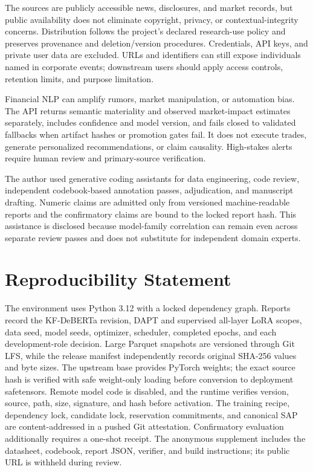 \documentclass[11pt]{article}
\begin{document}
The sources are publicly accessible news, disclosures, and market records, but public availability does not eliminate copyright, privacy, or contextual-integrity concerns. Distribution follows the project's declared research-use policy and preserves provenance and deletion/version procedures. Credentials, API keys, and private user data are excluded. URLs and identifiers can still expose individuals named in corporate events; downstream users should apply access controls, retention limits, and purpose limitation.

Financial NLP can amplify rumors, market manipulation, or automation bias. The API returns semantic materiality and observed market-impact estimates separately, includes confidence and model version, and fails closed to validated fallbacks when artifact hashes or promotion gates fail. It does not execute trades, generate personalized recommendations, or claim causality. High-stakes alerts require human review and primary-source verification.

The author used generative coding assistants for data engineering, code review, independent codebook-based annotation passes, adjudication, and manuscript drafting. Numeric claims are admitted only from versioned machine-readable reports and the confirmatory claims are bound to the locked report hash. This assistance is disclosed because model-family correlation can remain even across separate review passes and does not substitute for independent domain experts.

\section*{Reproducibility Statement}

The environment uses Python 3.12 with a locked dependency graph. Reports record the KF-DeBERTa revision, DAPT and supervised all-layer LoRA scopes, data seed, model seeds, optimizer, scheduler, completed epochs, and each development-role decision. Large Parquet snapshots are versioned through Git LFS, while the release manifest independently records original SHA-256 values and byte sizes. The upstream base provides PyTorch weights; the exact source hash is verified with safe weight-only loading before conversion to deployment safetensors. Remote model code is disabled, and the runtime verifies version, source, path, size, signature, and hash before activation. The training recipe, dependency lock, candidate lock, reservation commitments, and canonical SAP are content-addressed in a pushed Git attestation. Confirmatory evaluation additionally requires a one-shot receipt. The anonymous supplement includes the datasheet, codebook, report JSON, verifier, and build instructions; its public URL is withheld during review.
\end{document}
